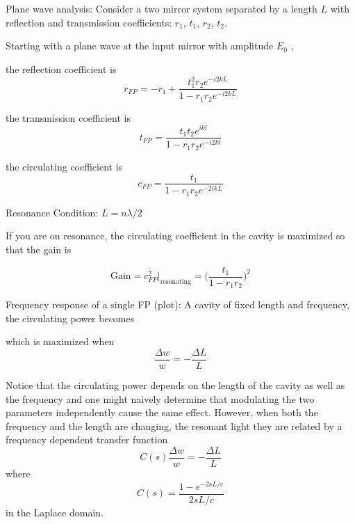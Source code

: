 		Plane wave analysis:
		Consider a two mirror system separated by a length $L$ with reflection and transmission coefficients: $r_1$, $t_1$, $r_2$, $t_2$.
		
		Starting with a plane wave at the input mirror with amplitude $E_0$ \cite{Saulson}, 
		
		the reflection coefficient is 
		\begin{equation}\label{r_FP}
		r_{FP} = -r_1 + \frac{t_1^2 r_2  e^{-i2kL}}{1-r_1 r_2 e^{-i2kL}}
		\end{equation}
		
		the transmission coefficient is
		\begin{equation}\label{t_FP}
		t_{FP} = \frac{t_1 t_2 e^{ikl}}{1-r_1 r_2 e^{-i2kl}}
		\end{equation}
		
		the circulating coefficient is
		\begin{equation}\label{c_FP}
		c_{FP} = \frac{t_1}{1- r_1 r_2 e^{-2ikL}}
		\end{equation}
		
		Resonance Condition: $L = n \lambda / 2$  
		
		If you are on resonance, the circulating coefficient in the cavity is maximized so that the gain is
		
		\begin{equation}
		\text{Gain} = c^2_{FP} \vert_{\text{resonating}} = \bigg( \frac{t_1}{1-r_1 r_2}\bigg)^2
		\end{equation}
		
		Frequency response of a single FP (plot):
		\cite{Lawrence:99} \cite{dynamicFP}
		A cavity of fixed length and frequency, the circulating power becomes
	
		which is maximized when 
		\begin{equation}
		\frac{\Delta w}{w} = -\frac{\Delta L}{L}
		\end{equation}
		
		Notice that the circulating power depends on the length of the cavity as well as the frequency and one might naively determine that modulating the two parameters independently cause the same effect.  However, when both the frequency and the length are changing, the resonant light  they are related by a frequency dependent transfer function
		\begin{equation}
		C(s) \frac{\Delta w}{w} = -\frac{\Delta L}{L}
		\end{equation}
		where
		\begin{equation}
		C(s) = \frac{1-e^{-2sL/c}}{2sL/c}
		\end{equation}
		in the Laplace domain.
		
